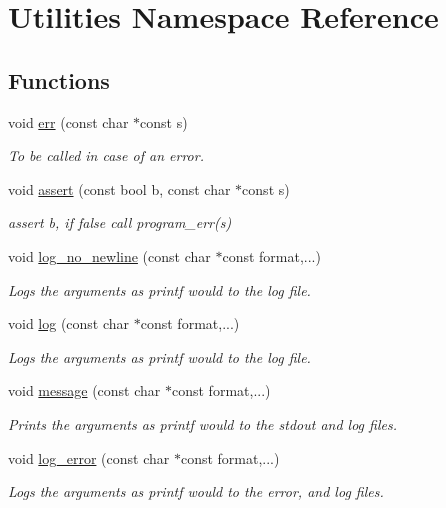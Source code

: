 \hypertarget{namespace_utilities}{}\section{Utilities Namespace Reference}
\label{namespace_utilities}
\subsection*{Functions}
\begin{DoxyCompactItemize}
\item 
void \hyperlink{namespace_utilities_a5308da50597c93aad2b1ca2ecfbcb723}{err} (const char $\ast$const s)
\begin{DoxyCompactList}\small\item\em To be called in case of an error. \end{DoxyCompactList}\item 
void \hyperlink{namespace_utilities_a22c85a2970e168ca0b9ad6fd86752792}{assert} (const bool b, const char $\ast$const s)
\begin{DoxyCompactList}\small\item\em assert b, if false call program\+\_\+err(s) \end{DoxyCompactList}\item 
void \hyperlink{namespace_utilities_af31967f218e82230e887a5551e5c2d1e}{log\+\_\+no\+\_\+newline} (const char $\ast$const format,...)
\begin{DoxyCompactList}\small\item\em Logs the arguments as printf would to the log file. \end{DoxyCompactList}\item 
void \hyperlink{namespace_utilities_a7e53321a2a9460f126a476a89b08107b}{log} (const char $\ast$const format,...)
\begin{DoxyCompactList}\small\item\em Logs the arguments as printf would to the log file. \end{DoxyCompactList}\item 
void \hyperlink{namespace_utilities_a0e46f2da74b1069eb9df671efed9180d}{message} (const char $\ast$const format,...)
\begin{DoxyCompactList}\small\item\em Prints the arguments as printf would to the stdout and log files. \end{DoxyCompactList}\item 
void \hyperlink{namespace_utilities_a48952d33b9dc4fba9846dbc7a12df2f1}{log\+\_\+error} (const char $\ast$const format,...)
\begin{DoxyCompactList}\small\item\em Logs the arguments as printf would to the error, and log files. \end{DoxyCompactList}\end{DoxyCompactItemize}


